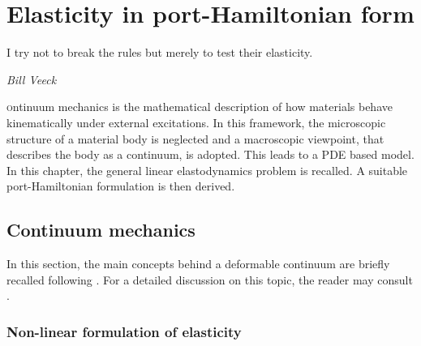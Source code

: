 \chapter{Elasticity in port-Hamiltonian form}

\epigraph{I try not to break the rules but merely to test their elasticity.}{\textit{Bill Veeck}}
\minitoc

\lettrine{\color{theme}{C}}ontinuum mechanics is the mathematical description of how materials behave kinematically under external excitations. In this framework, the microscopic structure of a material body is neglected and a macroscopic viewpoint, that describes the body as a continuum, is adopted. This leads to a PDE based model. In this chapter, the general linear elastodynamics problem is recalled. A suitable port-Hamiltonian formulation is then derived.

\section{Continuum mechanics}
In this section, the main concepts behind a deformable continuum are briefly recalled following \cite{lee2012mixed}. For a detailed discussion on this topic, the reader may consult \cite{abeyaratne2012notes,landau2012elasticity}. 

\subsection{Non-linear formulation of elasticity}

